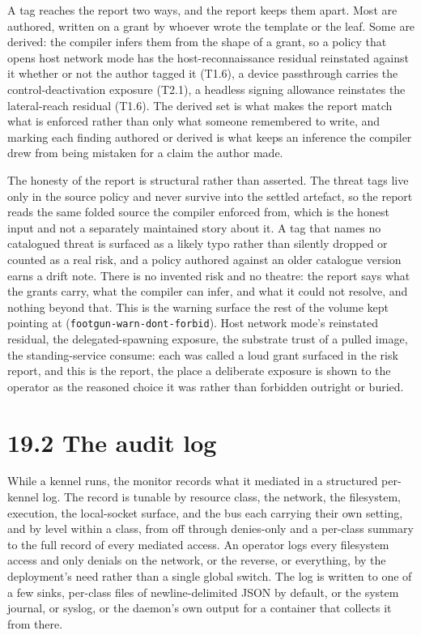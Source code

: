 A tag reaches the report two ways, and the report keeps them apart. Most
are authored, written on a grant by whoever wrote the template or the
leaf. Some are derived: the compiler infers them from the shape of a
grant, so a policy that opens host network mode has the
host-reconnaissance residual reinstated against it whether or not the
author tagged it (T1.6), a device passthrough carries the
control-deactivation exposure (T2.1), a headless signing allowance
reinstates the lateral-reach residual (T1.6). The derived set is what
makes the report match what is enforced rather than only what someone
remembered to write, and marking each finding authored or derived is
what keeps an inference the compiler drew from being mistaken for a
claim the author made.

The honesty of the report is structural rather than asserted. The threat
tags live only in the source policy and never survive into the settled
artefact, so the report reads the same folded source the compiler
enforced from, which is the honest input and not a separately maintained
story about it. A tag that names no catalogued threat is surfaced as a
likely typo rather than silently dropped or counted as a real risk, and
a policy authored against an older catalogue version earns a drift note.
There is no invented risk and no theatre: the report says what the
grants carry, what the compiler can infer, and what it could not
resolve, and nothing beyond that. This is the warning surface the rest
of the volume kept pointing at (\texttt{footgun-warn-dont-forbid}). Host
network mode's reinstated residual, the delegated-spawning exposure, the
substrate trust of a pulled image, the standing-service consume: each
was called a loud grant surfaced in the risk report, and this is the
report, the place a deliberate exposure is shown to the operator as the
reasoned choice it was rather than forbidden outright or buried.

\hypertarget{the-audit-log}{%
\section{19.2 The audit log}\label{the-audit-log}}

While a kennel runs, the monitor records what it mediated in a
structured per-kennel log. The record is tunable by resource class, the
network, the filesystem, execution, the local-socket surface, and the
bus each carrying their own setting, and by level within a class, from
off through denies-only and a per-class summary to the full record of
every mediated access. An operator logs every filesystem access and only
denials on the network, or the reverse, or everything, by the
deployment's need rather than a single global switch. The log is written
to one of a few sinks, per-class files of newline-delimited JSON by
default, or the system journal, or syslog, or the daemon's own output
for a container that collects it from there.


